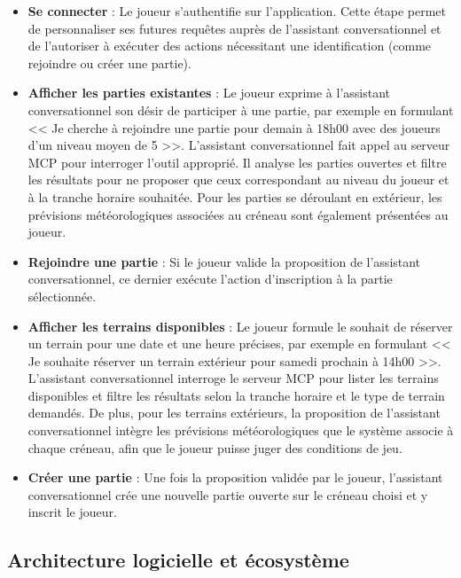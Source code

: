 \documentclass[12pt]{article}
\begin{document}
\begin{itemize}
\item \textbf{Se connecter} : Le joueur s'authentifie sur l'application. Cette étape permet de personnaliser ses futures requêtes auprès de l'assistant conversationnel et de l'autoriser à exécuter des actions nécessitant une identification (comme rejoindre ou créer une partie).
\item \textbf{Afficher les parties existantes} : Le joueur exprime à l'assistant conversationnel son désir de participer à une partie, par exemple en formulant << Je cherche à rejoindre une partie pour demain à 18h00 avec des joueurs d'un niveau moyen de 5 >>. L'assistant conversationnel fait appel au serveur MCP pour interroger l'outil approprié. Il analyse les parties ouvertes et filtre les résultats pour ne proposer que ceux correspondant au niveau du joueur et à la tranche horaire souhaitée. Pour les parties se déroulant en extérieur, les prévisions météorologiques associées au créneau sont également présentées au joueur.
\item \textbf{Rejoindre une partie} : Si le joueur valide la proposition de l'assistant conversationnel, ce dernier exécute l'action d'inscription à la partie sélectionnée.
\item \textbf{Afficher les terrains disponibles} : Le joueur formule le souhait de réserver un terrain pour une date et une heure précises, par exemple en formulant << Je souhaite réserver un terrain extérieur pour samedi prochain à 14h00 >>. L'assistant conversationnel interroge le serveur MCP pour lister les terrains disponibles et filtre les résultats selon la tranche horaire et le type de terrain demandés. De plus, pour les terrains extérieurs, la proposition de l'assistant conversationnel intègre les prévisions météorologiques que le système associe à chaque créneau, afin que le joueur puisse juger des conditions de jeu.
\item \textbf{Créer une partie} : Une fois la proposition validée par le joueur, l'assistant conversationnel crée une nouvelle partie ouverte sur le créneau choisi et y inscrit le joueur.
\end{itemize}
\subsection{Architecture logicielle et écosystème}
\end{document}
